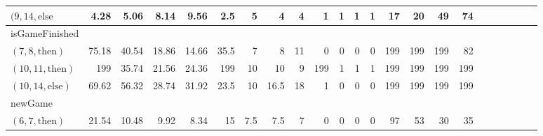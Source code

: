 \documentclass[sigconf]{acmart}
\newcommand{\thenBr}{\text{then}}
\newcommand{\elseBr}{\text{else}}
\newcommand{\inFor}{\text{inFor}}
\begin{document}
\begin{table*}
{\begin{tabular}{l|rrrr|rrrr|rrrr|rrrr|r|r|r|r|r|r}
    $(9,14,\elseBr$   & 4.28        & 5.06        & 8.14           & 9.56          & 2.5   & 5     & 4       & 4       & 1        & 1        & 1          & 1           & 17       & 20      & 49         & 74  & & & & & & \\
    \midrule
    isGameFinished    &             &             &                &               &       &       &         &         &          &          &            &             &          &         &            & & & & & & & \\
    $(7,8,\thenBr)$   & 75.18       & 40.54       & 18.86          & 14.66         & 35.5  & 7     & 8       & 11      & 0        & 0        & 0          & 0           & 199      & 199     & 199        & 82  & & & & & & \\
    $(10,11,\thenBr)$ & 199         & 35.74       & 21.56          & 24.36         & 199   & 10    & 10      & 9       & 199      & 1        & 1          & 1           & 199      & 199     & 199        & 199 & & & & & & \\
    $(10,14,\elseBr)$ & 69.62       & 56.32       & 28.74          & 31.92         & 23.5  & 10    & 16.5    & 18      & 1        & 0        & 0          & 0           & 199      & 199     & 199        & 199 & & & & & & \\
    \midrule
    newGame           &             &             &                &               &       &       &         &         &          &          &            &             &          &         &            & & & & & & & \\
    $(6,7,\thenBr)$   & 21.54       & 10.48       & 9.92           & 8.34          & 15    & 7.5   & 7.5     & 7       & 0        & 0        & 0          & 0           & 97       & 53      & 30         & 35 & & & & & & \\

\end{tabular}}
\end{table*}
\end{document}
